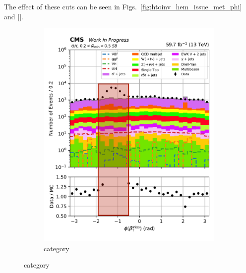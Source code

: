 \medskip

\noindent{}The effect of these cuts can be seen in Figs.~\ref{fig:htoinv_hem_issue_met_phi} and \ref{}.

\begin{figure}[htbp]
    \centering
    \begin{subfigure}[b]{0.34\textwidth}
        \includegraphics[width=\textwidth]{figures/hem_issue/sideband_4/met_phi_ttH_before_annotated.pdf}
        \caption{\ttH category}
    \end{subfigure}

\end{figure}
